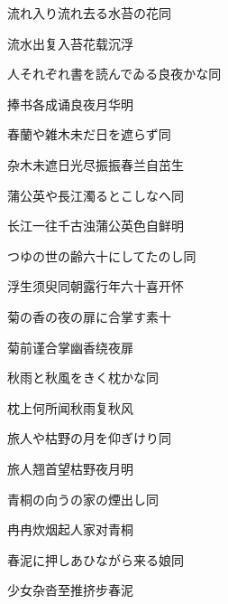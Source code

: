 \begin{haiku}
    {\FH 流れ入り流れ去る水苔の花}\hfill{\FH 同}

    {\FK 流水出复入苔花载沉浮}
\end{haiku}

\begin{haiku}
    {\FH 人それぞれ書を読んでゐる良夜かな}\hfill{\FH 同}

    {\FK 捧书各成诵良夜月华明}
\end{haiku}

\begin{haiku}
    {\FH 春蘭や雑木未だ日を遮らず}\hfill{\FH 同}

    {\FK 杂木未遮日光尽振振春兰自茁生}
\end{haiku}

\begin{haiku}
    {\FH 蒲公英や長江濁るとこしなへ}\hfill{\FH 同}

    {\FK 长江一往千古浊蒲公英色自鲜明}
\end{haiku}

\begin{haiku}
    {\FH つゆの世の齢六十にしてたのし}\hfill{\FH 同}

    {\FK 浮生须臾同朝露行年六十喜开怀}
\end{haiku}

\begin{haiku}
    {\FH 菊の香の夜の扉に合掌す}\hfill{\FH 素十}

    {\FK 菊前谨合掌幽香绕夜扉}
\end{haiku}

\begin{haiku}
    {\FH 秋雨と秋風をきく枕かな}\hfill{\FH 同}

    {\FK 枕上何所闻秋雨复秋风}
\end{haiku}

\begin{haiku}
    {\FH 旅人や枯野の月を仰ぎけり}\hfill{\FH 同}

    {\FK 旅人翘首望枯野夜月明}
\end{haiku}

\begin{haiku}
    {\FH 青桐の向うの家の煙出し}\hfill{\FH 同}

    {\FK 冉冉炊烟起人家对青桐}
\end{haiku}

\begin{haiku}
    {\FH 春泥に押しあひながら来る娘}\hfill{\FH 同}

    {\FK 少女杂沓至推挤步春泥}
\end{haiku}

